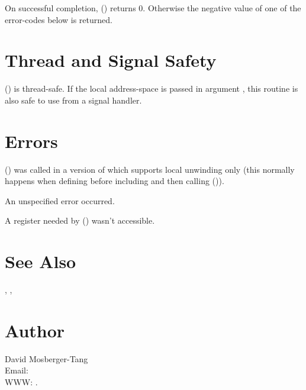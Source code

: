\documentclass{article}
\begin{document}
On successful completion, () returns 0.
Otherwise the negative value of one of the error-codes below is
returned.

\section{Thread and Signal Safety}

() is thread-safe.  If the local address-space
is passed in argument , this routine is also safe to use from
a signal handler.

\section{Errors}

\begin{Description}
\item[\Const{UNW\_EINVAL}] () was called in a
  version of  which supports local unwinding only
  (this normally happens when defining  before
  including  and then calling
  ()).
\item[\Const{UNW\_EUNSPEC}] An unspecified error occurred.
\item[\Const{UNW\_EBADREG}] A register needed by ()
  wasn't accessible.
\end{Description}

\section{See Also}

, ,

\section{Author}

\noindent
David Mosberger-Tang\\
Email: \\
WWW: .
\LatexManEnd
\end{document}
